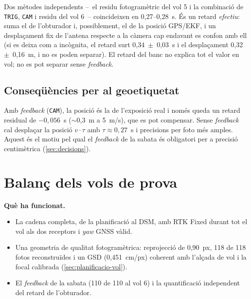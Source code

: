 Dos mètodes independents --~el residu fotogramètric del vol 5 i la combinació de \texttt{TRIG}, \texttt{CAM} i residu del vol 6~-- coincideixen en 0,27--0,28~s. És un retard \emph{efectiu}: suma el de l'obturador i, possiblement, el de la posició GPS/EKF, i un desplaçament fix de l'antena respecte a la càmera cap endavant es confon amb ell (si es deixa com a incògnita, el retard surt 0,34~$\pm$~0,03~s i el desplaçament 0,32~$\pm$~0,16~m, i no es poden separar). El retard del banc no explica tot el valor en vol; no es pot separar sense \emph{feedback}.

\subsection{Conseqüències per al geoetiquetat}

Amb \emph{feedback} (\texttt{CAM}), la posició és la de l'exposició real i només queda un retard residual de $-0{,}056$~s ($\sim$0,3~m a 5~m/s), que es pot compensar. Sense \emph{feedback} cal desplaçar la posició $v\cdot\tau$ amb $\tau \approx 0{,}27$~s i precisions per foto més amples. Aquest és el motiu pel qual el \emph{feedback} de la sabata és obligatori per a precisió centimètrica (\cref{sec:decisions}).

\section{Balanç dels vols de prova}
\label{sec:balanc-vols}

\textbf{Què ha funcionat.}
\begin{itemize}
    \item La cadena completa, de la planificació al DSM, amb RTK Fixed durant tot el vol als dos receptors i \emph{yaw} GNSS vàlid.
    \item Una geometria de qualitat fotogramètrica: reprojecció de 0,90~px, 118 de 118 fotos reconstruïdes i un GSD (0,451~cm/px) coherent amb l'alçada de vol i la focal calibrada (\cref{sec:planificacio-vol}).
    \item El \emph{feedback} de la sabata (110 de 110 al vol 6) i la quantificació independent del retard de l'obturador.
\end{itemize}

